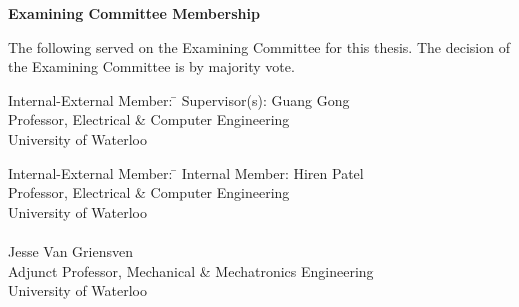 \documentclass[letterpaper,12pt,titlepage,oneside,final]{book}
\let\origdoublepage\cleardoublepage
\newcommand{\clearemptydoublepage}{%
  \clearpage{\pagestyle{empty}\origdoublepage}}
\let\cleardoublepage\clearemptydoublepage
\begin{document}
\pagestyle{plain}
\setcounter{page}{2}

\cleardoublepage %
 
\begin{center}\textbf{Examining Committee Membership}\end{center}
  \noindent
The following served on the Examining Committee for this thesis. The decision of the Examining Committee is by majority vote.
  \bigskip
  
  
  \noindent
\begin{tabbing}
Internal-External Member: \=  \kill %
Supervisor(s): \> Guang Gong \\
\> Professor, Electrical \& Computer Engineering \\
\> University of Waterloo \\
\end{tabbing}
  \bigskip
  
  \noindent
  \begin{tabbing}
Internal-External Member: \=  \kill %
Internal Member: \> Hiren Patel \\
\> Professor, Electrical \& Computer Engineering \\
\> University of Waterloo \\
\\
\> Jesse Van Griensven \\
\> Adjunct Professor, Mechanical \& Mechatronics Engineering \\
\> University of Waterloo \\
\end{tabbing}
  \bigskip
  
\end{document}
